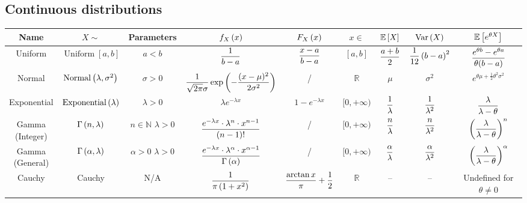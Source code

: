 \documentclass{article}
\theoremstyle{definition}
\theoremstyle{remark}
\newcommand{\RR}{\mathbb{R}}
\newcommand{\NN}{\mathbb{N}}
\newcommand{\Expt}{\mathbb{E}}
\newcommand{\plusinfty}{+\infty}
\newcommand{\ccintv}[2]{[#1,#2]}
\newcommand{\cointv}[2]{[#1,#2)}
\newcommand{\Var}{\operatorname{Var}}
\newcommand{\Uniform}{\operatorname{Uniform}}
\newcommand{\Exponential}{\operatorname{Exponential}}
\newcommand{\Normal}{\operatorname{Normal}}
\begin{document}
\begin{landscape}
\clearpage
\subsection{Continuous distributions}
\begin{table}[ht!]
    \centering
    \begin{tabular}{c|cc|ccc|cc|c}
        \hline\hline
        \textbf{Name} & \(X \sim\) & \textbf{Parameters} & \(f_X\left(x\right)\) & \(F_X\left(x\right)\) & \(x \in\) & \(\Expt\bqty{X}\) & \(\Var\pqty{X}\) & \(\Expt\bqty{e^{\theta X}}\) \\
        \hline\hline
        Uniform & \(\Uniform\ccintv{a}{b}\) & \(a < b\) & \(\displaystyle \frac{1}{b - a}\) & \(\displaystyle \frac{x - a}{b - a}\) & \(\ccintv{a}{b}\) &\(\displaystyle\frac{a + b}{2}\) & \(\displaystyle \frac{1}{12}\left(b - a\right)^2\) & \(\displaystyle\frac{e^{\theta b} - e^{\theta a}}{\theta (b - a)}\) \\
        \hline
        Normal & \(\Normal\pqty{\lambda, \sigma^2}\) & \(\sigma > 0\) & \(\displaystyle \frac{1}{\sqrt{2\pi}\sigma}\exp\left(-\frac{(x - \mu)^2}{2\sigma^2}\right)\) & / & \(\RR\) & \(\mu\) & \(\sigma^2\) & \(e^{\theta\mu + \frac{1}{2}\theta^2\sigma^2}\)\\
        \hline
        Exponential & \(\Exponential\pqty{\lambda}\) & \(\lambda > 0\) & \(\lambda e^{-\lambda x}\) & \(1 - e^{-\lambda x}\) & \(\cointv{0}{\plusinfty}\) & \(\displaystyle \frac{1}{\lambda}\) & \(\displaystyle \frac{1}{\lambda^2}\) & \(\displaystyle \frac{\lambda}{\lambda - \theta}\) \\
        \hline
        \makecell{Gamma \\ (Integer)} & \(\Gamma\left(n, \lambda\right)\) & \makecell{\(n \in \NN\) \\ \(\lambda > 0\)} & \(\displaystyle \frac{e^{-\lambda x} \cdot \lambda^n \cdot x^{n - 1}}{\left(n - 1\right)!}\) & / & \(\cointv{0}{\plusinfty}\) & \(\displaystyle\frac{n}{\lambda}\) & \(\displaystyle \frac{n}{\lambda^2}\) & \(\displaystyle\left(\frac{\lambda}{\lambda - \theta}\right)^n\) \\
        \hline
        \makecell{Gamma \\ (General)} & \(\Gamma\left(\alpha, \lambda\right)\) & \makecell{\(\alpha > 0\) \\ \(\lambda > 0\)} & \(\displaystyle \frac{e^{-\lambda x} \cdot \lambda^{\alpha} \cdot x^{\alpha - 1}}{\Gamma\left(\alpha\right)}\) & / & \(\cointv{0}{\plusinfty}\) & \(\displaystyle\frac{\alpha}{\lambda}\) & \(\displaystyle \frac{\alpha}{\lambda^2}\) & \(\displaystyle\left(\frac{\lambda}{\lambda - \theta}\right)^{\alpha}\) \\
        \hline
        Cauchy & Cauchy & N/A & \(\displaystyle \frac{1}{\pi\left(1 + x^2\right)}\) & \(\displaystyle \frac{\arctan x}{\pi} + \frac{1}{2}\) & \(\RR\) & -- & -- & Undefined for \(\theta \neq 0\) \\

\end{tabular}
\end{table}
\end{landscape}
\end{document}
